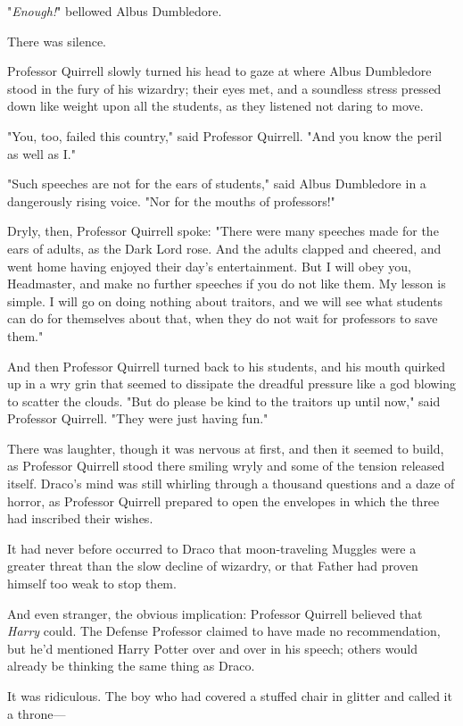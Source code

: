 "\emph{Enough!}" bellowed Albus Dumbledore.

There was silence.

Professor Quirrell slowly turned his head to gaze at where Albus Dumbledore
stood in the fury of his wizardry; their eyes met, and a soundless stress
pressed down like weight upon all the students, as they listened not daring to
move.

"You, too, failed this country," said Professor Quirrell. "And you know the
peril as well as I."

"Such speeches are not for the ears of students," said Albus Dumbledore in a
dangerously rising voice. "Nor for the mouths of professors!"

Dryly, then, Professor Quirrell spoke: "There were many speeches made for the
ears of adults, as the Dark Lord rose. And the adults clapped and cheered, and
went home having enjoyed their day's entertainment. But I will obey you,
Headmaster, and make no further speeches if you do not like them. My lesson is
simple. I will go on doing nothing about traitors, and we will see what
students can do for themselves about that, when they do not wait for professors
to save them."

And then Professor Quirrell turned back to his students, and his mouth quirked
up in a wry grin that seemed to dissipate the dreadful pressure like a god
blowing to scatter the clouds. "But do please be kind to the traitors up until
now," said Professor Quirrell. "They were just having fun."

There was laughter, though it was nervous at first, and then it seemed to
build, as Professor Quirrell stood there smiling wryly and some of the tension
released itself.
\later
Draco's mind was still whirling through a thousand questions and a daze of
horror, as Professor Quirrell prepared to open the envelopes in which the three
had inscribed their wishes.

It had never before occurred to Draco that moon-traveling Muggles were a
greater threat than the slow decline of wizardry, or that Father had proven
himself too weak to stop them.

And even stranger, the obvious implication: Professor Quirrell believed that
\emph{Harry} could. The Defense Professor claimed to have made no
recommendation, but he'd mentioned Harry Potter over and over in his speech;
others would already be thinking the same thing as Draco.

It was ridiculous. The boy who had covered a stuffed chair in glitter and
called it a throne---

